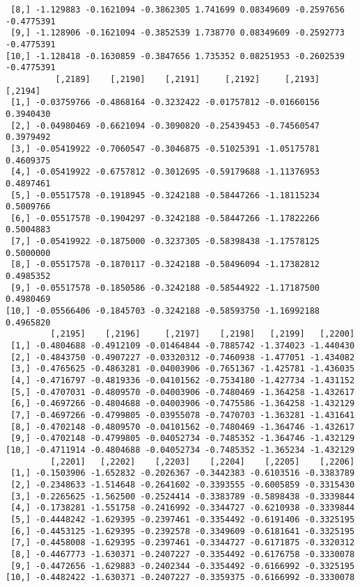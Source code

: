 \documentclass[
  letterpaper,
  DIV=11,
  numbers=noendperiod]{scrreprt}
\begin{document}
\begin{verbatim}
 [8,] -1.129883 -0.1621094 -0.3862305 1.741699 0.08349609 -0.2597656 -0.4775391
 [9,] -1.128906 -0.1621094 -0.3852539 1.738770 0.08349609 -0.2592773 -0.4775391
[10,] -1.128418 -0.1630859 -0.3847656 1.735352 0.08251953 -0.2602539 -0.4775391
          [,2189]    [,2190]    [,2191]     [,2192]     [,2193]   [,2194]
 [1,] -0.03759766 -0.4868164 -0.3232422 -0.01757812 -0.01660156 0.3940430
 [2,] -0.04980469 -0.6621094 -0.3090820 -0.25439453 -0.74560547 0.3979492
 [3,] -0.05419922 -0.7060547 -0.3046875 -0.51025391 -1.05175781 0.4609375
 [4,] -0.05419922 -0.6757812 -0.3012695 -0.59179688 -1.11376953 0.4897461
 [5,] -0.05517578 -0.1918945 -0.3242188 -0.58447266 -1.18115234 0.5009766
 [6,] -0.05517578 -0.1904297 -0.3242188 -0.58447266 -1.17822266 0.5004883
 [7,] -0.05419922 -0.1875000 -0.3237305 -0.58398438 -1.17578125 0.5000000
 [8,] -0.05517578 -0.1870117 -0.3242188 -0.58496094 -1.17382812 0.4985352
 [9,] -0.05517578 -0.1850586 -0.3242188 -0.58544922 -1.17187500 0.4980469
[10,] -0.05566406 -0.1845703 -0.3242188 -0.58593750 -1.16992188 0.4965820
         [,2195]    [,2196]     [,2197]    [,2198]   [,2199]   [,2200]
 [1,] -0.4804688 -0.4912109 -0.01464844 -0.7885742 -1.374023 -1.440430
 [2,] -0.4843750 -0.4907227 -0.03320312 -0.7460938 -1.477051 -1.434082
 [3,] -0.4765625 -0.4863281 -0.04003906 -0.7651367 -1.425781 -1.436035
 [4,] -0.4716797 -0.4819336 -0.04101562 -0.7534180 -1.427734 -1.431152
 [5,] -0.4707031 -0.4809570 -0.04003906 -0.7480469 -1.364258 -1.432617
 [6,] -0.4697266 -0.4804688 -0.04003906 -0.7475586 -1.364258 -1.432129
 [7,] -0.4697266 -0.4799805 -0.03955078 -0.7470703 -1.363281 -1.431641
 [8,] -0.4702148 -0.4809570 -0.04101562 -0.7480469 -1.364746 -1.432617
 [9,] -0.4702148 -0.4799805 -0.04052734 -0.7485352 -1.364746 -1.432129
[10,] -0.4711914 -0.4804688 -0.04052734 -0.7485352 -1.365234 -1.432129
         [,2201]   [,2202]    [,2203]    [,2204]    [,2205]    [,2206]
 [1,] -0.1503906 -1.652832 -0.2026367 -0.3442383 -0.6103516 -0.3383789
 [2,] -0.2348633 -1.514648 -0.2641602 -0.3393555 -0.6005859 -0.3315430
 [3,] -0.2265625 -1.562500 -0.2524414 -0.3383789 -0.5898438 -0.3339844
 [4,] -0.1738281 -1.551758 -0.2416992 -0.3344727 -0.6210938 -0.3339844
 [5,] -0.4448242 -1.629395 -0.2397461 -0.3354492 -0.6191406 -0.3325195
 [6,] -0.4453125 -1.629395 -0.2392578 -0.3349609 -0.6181641 -0.3325195
 [7,] -0.4458008 -1.629395 -0.2397461 -0.3344727 -0.6171875 -0.3320312
 [8,] -0.4467773 -1.630371 -0.2407227 -0.3354492 -0.6176758 -0.3330078
 [9,] -0.4472656 -1.629883 -0.2402344 -0.3354492 -0.6166992 -0.3325195
[10,] -0.4482422 -1.630371 -0.2407227 -0.3359375 -0.6166992 -0.3330078

\end{verbatim}
\end{document}
